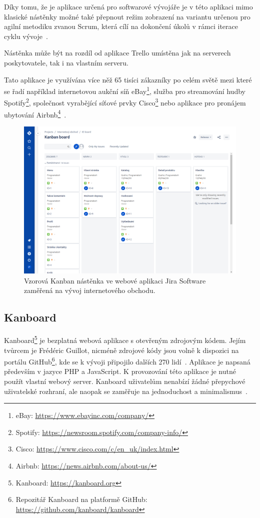 Díky tomu, že je aplikace určená pro softwarové vývojáře je v této aplikaci mimo klasické nástěnky možné také přepnout režim zobrazení na variantu určenou pro agilní metodiku zvanou Scrum, která cílí na dokončení úkolů v rámci iterace cyklu vývoje~\cite{bib:trello-vs-jira-2020}.

Nástěnka může být na rozdíl od aplikace Trello umístěna jak na serverech poskytovatele, tak i na vlastním serveru.

Tato aplikace je využívána více něž 65 tisíci zákazníky po celém světě mezi které se řadí například internetovou aukční síň eBay\footnote{eBay: \url{https://www.ebayinc.com/company/}}, služba pro streamování hudby Spotify\footnote{Spotify: \url{https://newsroom.spotify.com/company-info/}}, společnost vyrabějící síťové prvky Cisco\footnote{Cisco: \url{https://www.cisco.com/c/en_uk/index.html}} nebo aplikace pro pronájem ubytování Airbnb\footnote{Airbnb: \url{https://news.airbnb.com/about-us/}}~\cite{bib:jira-homepage}.

\begin{figure}[H]
	\centering
	\includegraphics[width=\textwidth]{obrazky-figures/jira.png}
	\caption{Vzorová Kanban nástěnka ve webové aplikaci Jira Software zaměřená na vývoj internetového obchodu.}
\end{figure}

\subsection{Kanboard}
Kanboard\footnote{Kanboard: \url{https://kanboard.org}} je bezplatná webová aplikace s otevřeným zdrojovým kódem. Jejím tvůrcem je Frédéric Guillot, nicméně zdrojové kódy jsou volně k dispozici na portálu GitHub\footnote{Repozitář Kanboard na platformě GitHub: \url{https://github.com/kanboard/kanboard}}, kde se k vývoji připojilo dalších 270 lidí~\cite{bib:kanboard-github}. Aplikace je napsaná především v jazyce PHP a JavaScript. K provozování této aplikace je nutné použít vlastní webový server. Kanboard uživatelům nenabízí žádné přepychové uživatelské rozhraní, ale naopak se zaměřuje na jednoduchost a minimalismus~\cite{bib:kanboard}.

